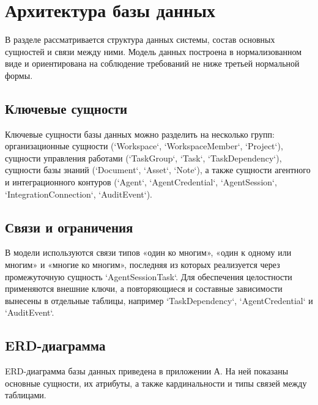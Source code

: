 \section{Архитектура базы данных}
\headingtextsep

В разделе рассматривается структура данных системы, состав основных сущностей и связи между ними. Модель данных построена в нормализованном виде и ориентирована на соблюдение требований не ниже третьей нормальной формы.

\textheadingsep
\subsection{Ключевые сущности}
\headingtextsep

Ключевые сущности базы данных можно разделить на несколько групп: организационные сущности (`Workspace`, `WorkspaceMember`, `Project`), сущности управления работами (`TaskGroup`, `Task`, `TaskDependency`), сущности базы знаний (`Document`, `Asset`, `Note`), а также сущности агентного и интеграционного контуров (`Agent`, `AgentCredential`, `AgentSession`, `IntegrationConnection`, `AuditEvent`).

\textheadingsep
\subsection{Связи и ограничения}
\headingtextsep

В модели используются связи типов «один ко многим», «один к одному или многим» и «многие ко многим», последняя из которых реализуется через промежуточную сущность `AgentSessionTask`. Для обеспечения целостности применяются внешние ключи, а повторяющиеся и составные зависимости вынесены в отдельные таблицы, например `TaskDependency`, `AgentCredential` и `AuditEvent`.

\textheadingsep
\subsection{ERD-диаграмма}
\headingtextsep

ERD-диаграмма базы данных приведена в приложении А. На ней показаны основные сущности, их атрибуты, а также кардинальности и типы связей между таблицами.